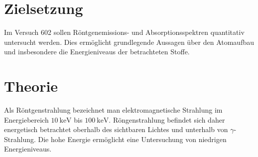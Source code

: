 \setcounter{page}{1}
\section*{Zielsetzung}
Im Versuch 602 sollen Röntgenemissions- und Absorptionsspektren quantitativ untersucht werden.
Dies ermöglicht grundlegende Aussagen über den Atomaufbau und insbesondere die Energieniveaus
der betrachteten Stoffe.
\section{Theorie}
Als Röntgenstrahlung bezeichnet man elektromagnetische Strahlung im Energiebereich $\SI{10}{\kilo\eV}$
bis $\SI{100}{\kilo\eV}$. Röngenstrahlung befindet sich daher energetisch betrachtet oberhalb des sichtbaren Lichtes und
unterhalb von $\gamma$-Strahlung. Die hohe Energie ermöglicht eine Untersuchung von niedrigen Energieniveaus.
